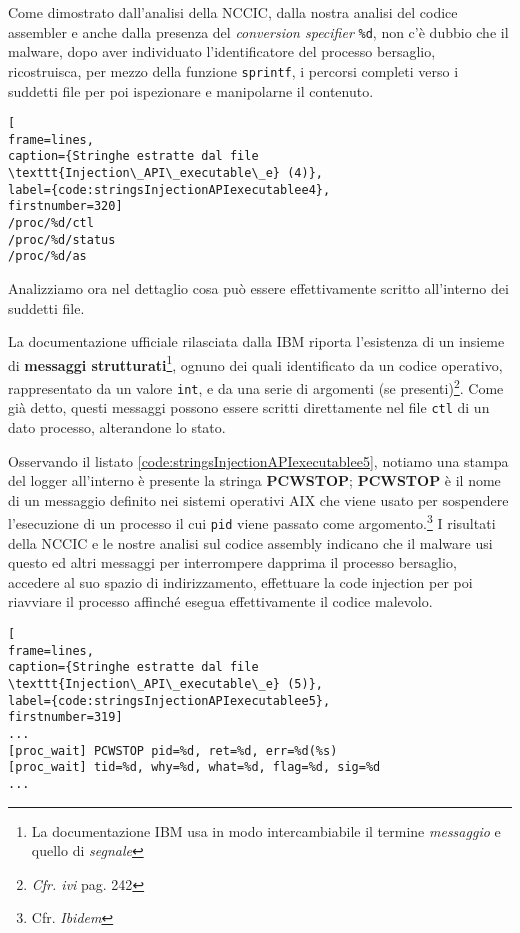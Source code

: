 \documentclass[10pt,a4paper, titlepage]{report}
\begin{document}
Come dimostrato dall'analisi della NCCIC, dalla nostra analisi del codice assembler e anche dalla presenza del \textit{conversion specifier} \texttt{\%d}, non c'è dubbio che il malware, dopo aver individuato l'identificatore del processo bersaglio, ricostruisca, per mezzo della funzione \texttt{sprintf}, i percorsi completi verso i suddetti file per poi ispezionare e manipolarne il contenuto.

\begin{lstlisting}[
frame=lines, 
caption={Stringhe estratte dal file \texttt{Injection\_API\_executable\_e} (4)}, 
label={code:stringsInjectionAPIexecutablee4},
firstnumber=320]
/proc/%d/ctl
/proc/%d/status
/proc/%d/as
\end{lstlisting}

Analizziamo ora nel dettaglio cosa può essere effettivamente scritto all'interno dei suddetti file.

La documentazione ufficiale rilasciata dalla IBM riporta l'esistenza di un insieme di \textbf{messaggi strutturati}\footnote{La documentazione IBM usa in modo intercambiabile il termine \textit{messaggio} e quello di \textit{segnale}}, ognuno dei quali identificato da un codice operativo, rappresentato da un valore \texttt{int}, e da una serie di argomenti (se presenti)\footnote{\textit{Cfr. ivi} pag. 242}. Come già detto, questi messaggi possono essere scritti direttamente nel file \texttt{ctl} di un dato processo, alterandone lo stato.

Osservando il listato \ref{code:stringsInjectionAPIexecutablee5}, notiamo una stampa del logger all'interno è presente la stringa \textbf{PCWSTOP}; \textbf{PCWSTOP} è il nome di un messaggio definito nei sistemi operativi AIX che viene usato per sospendere l'esecuzione di un processo il cui \texttt{pid} viene passato come argomento.\footnote{Cfr. \textit{Ibidem}}
I risultati della NCCIC e le nostre analisi sul codice assembly indicano che il malware usi questo ed altri messaggi per interrompere dapprima il processo bersaglio, accedere al suo spazio di indirizzamento, effettuare la code injection per poi riavviare il processo affinché esegua effettivamente il codice malevolo.

\begin{lstlisting}[
frame=lines, 
caption={Stringhe estratte dal file \texttt{Injection\_API\_executable\_e} (5)}, 
label={code:stringsInjectionAPIexecutablee5},
firstnumber=319]
...
[proc_wait] PCWSTOP pid=%d, ret=%d, err=%d(%s)
[proc_wait] tid=%d, why=%d, what=%d, flag=%d, sig=%d
...
\end{lstlisting}
\end{document}
